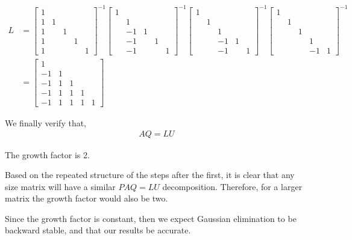 \documentclass[10pt]{article}
\begin{document}
\begin{solution}[Solution]
\begin{enumerate}
     {\tiny
     \begin{align*}
         L&=
         \left[\begin{array}{rrrrr}
            1 \\
            1 & 1 \\
            1 & & 1 \\
            1 & & & 1 \\
            1 & & & & 1 
         \end{array}\right]^{-1}
        \left[\begin{array}{rrrrr}
            1 \\
            & 1 \\
            & -1 & 1 \\
            & -1 & & 1 \\
            & -1 & & & 1 
        \end{array}\right]^{-1}
        \left[\begin{array}{rrrrr}
            1 \\
            & 1 \\
            & & 1 \\
            & & -1 & 1 \\
            & & -1 &  & 1 
        \end{array}\right]^{-1}
        \left[\begin{array}{rrrrr}
            1 \\
            & 1 \\
            & & 1 \\
            & & & 1 \\
            & & & -1 & 1 
        \end{array}\right]^{-1}
         \\&=
        \left[\begin{array}{rrrrr}
            1 \\
            -1 & 1 \\
            -1 & 1 & 1 \\
            -1 & 1 & 1 & 1 \\
            -1 & 1 & 1 & 1 & 1 
        \end{array}\right]
     \end{align*}
     }

     We finally verify that,
     \begin{align*}
        AQ = LU
     \end{align*}

     The growth factor is 2.

     Based on the repeated structure of the steps after the first, it is clear that any size matrix will have a similar \( PAQ=LU \) decomposition. Therefore, for a larger matrix the growth factor would also be two. 

     Since the growth factor is constant, then we expect Gaussian elimination to be backward stable, and that our results be accurate.

\end{enumerate}

\end{solution}
\end{document}
